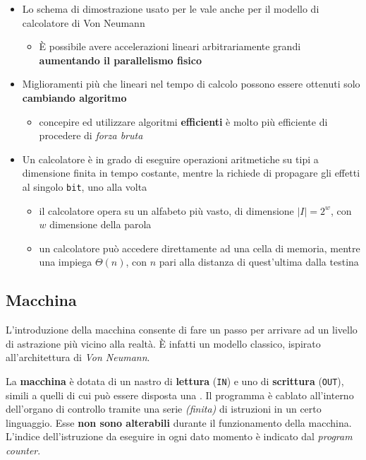 \documentclass[italian, 10pt]{article}
\begin{document}
\begin{itemize}
  \item Lo schema di dimostrazione usato per le \TM vale anche per il modello di calcolatore di Von Neumann
        \begin{itemize}[label=\(\rightarrow\)]
          \item È possibile avere accelerazioni lineari arbitrariamente grandi \textbf{aumentando il parallelismo fisico}
        \end{itemize}
  \item Miglioramenti più che lineari nel tempo di calcolo possono essere ottenuti solo \textbf{cambiando algoritmo}
        \begin{itemize}[label=\(\rightarrow\)]
          \item concepire ed utilizzare algoritmi \textbf{efficienti} è molto più efficiente di procedere di \textit{forza bruta}
        \end{itemize}
  \item Un calcolatore è in grado di eseguire operazioni aritmetiche su tipi a dimensione finita in tempo costante, mentre la \TM richiede di propagare gli effetti al singolo \texttt{bit}, uno alla volta
        \begin{itemize}[label=\(\rightarrow\)]
          \item il calcolatore opera su un alfabeto più vasto, di dimensione \(|I|=2^w\), con \(w\) dimensione della parola
          \item un calcolatore può accedere direttamente ad una cella di memoria, mentre una \TM impiega \(\Theta(n)\), con \(n\) pari alla distanza di quest'ultima dalla testina
        \end{itemize}
\end{itemize}

\subsection{Macchina \RAM}

L'introduzione della macchina \RAM consente di fare un passo per arrivare ad un livello di astrazione più vicino alla realtà.
È infatti un modello classico, ispirato all'architettura di \textit{Von Neumann}.

La \textbf{macchina \RAM} è dotata di un nastro di \textbf{lettura} (\texttt{IN}) e uno di \textbf{scrittura} (\texttt{OUT}), simili a quelli di cui può essere disposta una \TM.
Il programma è cablato all'interno dell'organo di controllo tramite una serie \textit{(finita)} di istruzioni in un certo linguaggio.
Esse \textbf{non sono alterabili} durante il funzionamento della macchina.
L'indice dell'istruzione da eseguire in ogni dato momento è indicato dal \textit{program counter}.
\end{document}
